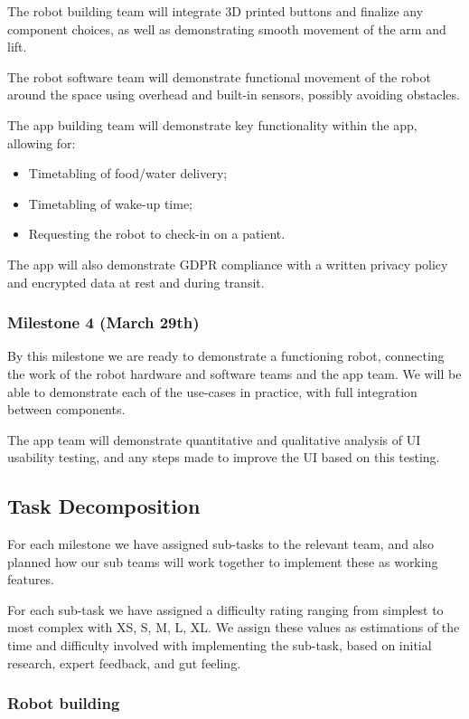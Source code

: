 \documentclass{article}
\begin{document}
The robot building team will integrate 3D printed buttons and finalize any component choices, as well as demonstrating smooth movement of the arm and lift. 

The robot software team will demonstrate functional movement of the robot around the space using overhead and built-in sensors, possibly avoiding obstacles. 

The app building team will demonstrate key functionality within the app, allowing for:
\begin{itemize}
\item Timetabling of food/water delivery;
\item Timetabling of wake-up time;
\item Requesting the robot to check-in on a patient.
\end{itemize}
The app will also demonstrate GDPR compliance with a written privacy policy and encrypted data at rest and during transit.

\subsubsection{Milestone 4 (March 29th)}
By this milestone we are ready to demonstrate a functioning robot, connecting the work of the robot hardware and software teams and the app team. We will be able to demonstrate each of the use-cases in practice, with full integration between components.

The app team will demonstrate quantitative and qualitative analysis of UI usability testing, and any steps made to improve the UI based on this testing.

\subsection{Task Decomposition}

For each milestone we have assigned sub-tasks to the relevant team, and also planned how our sub teams will work together to implement these as working features.

For each sub-task we have assigned a difficulty rating ranging from simplest to most complex with XS, S, M, L, XL. We assign these values as estimations of the time and difficulty involved with implementing the sub-task, based on initial research, expert feedback, and gut feeling. 


\subsubsection{Robot building}
\end{document}
